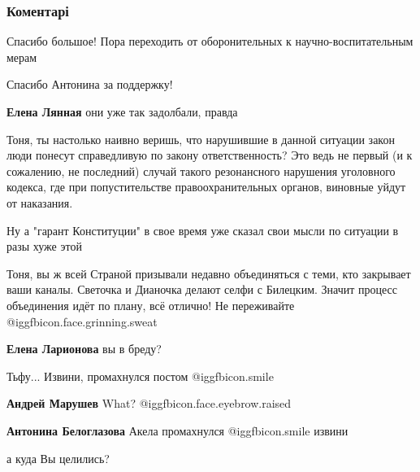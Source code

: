  
 
 
 
 
\subsubsection{Коментарі}
\label{sec:30_10_2021.fb.bieloglazova_antonina.1.napadenie_nash.cmt}

\begin{itemize} %
Спасибо большое! Пора переходить от оборонительных к научно-воспитательным мерам

Спасибо Антонина за поддержку!


\textbf{Елена Лянная} они уже так задолбали, правда


Тоня, ты настолько наивно веришь, что нарушившие в данной ситуации закон люди
понесут справедливую по закону ответственность? Это ведь не первый (и к
сожалению, не последний) случай такого резонансного нарушения уголовного
кодекса, где при попустительстве правоохранительных органов, виновные уйдут от
наказания.

Ну а "гарант Конституции" в свое время уже сказал свои мысли по ситуации в разы
хуже этой


Тоня, вы ж всей Страной призывали недавно объединяться с теми, кто закрывает
ваши каналы. Светочка и Дианочка делают селфи с Билецким. Значит процесс
объединения идёт по плану, всё отлично! Не переживайте  @igg{fbicon.face.grinning.sweat} 

\textbf{Елена Ларионова} вы в бреду?

Тьфу... Извини, промахнулся постом  @igg{fbicon.smile} 


\textbf{Андрей Марушев} What?  @igg{fbicon.face.eyebrow.raised} 

\textbf{Антонина Белоглазова} Акела промахнулся  @igg{fbicon.smile}  извини

а куда Вы целились?


\end{itemize}
